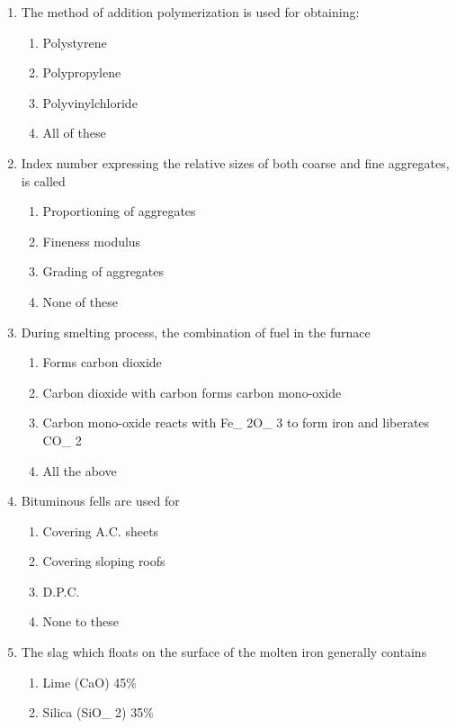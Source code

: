 \documentclass[11pt,a4paper]{article}
\begin{document}
\begin{enumerate}
\item{The method of addition polymerization is used for obtaining:}
\begin{enumerate}[label=\Alph*.]
\item{Polystyrene}
\item{Polypropylene}
\item{Polyvinylchloride}
\item{All of these}
\end{enumerate}
\item{Index number expressing the relative sizes of both coarse and fine aggregates, is called}
\begin{enumerate}[label=\Alph*.]
\item{Proportioning of aggregates}
\item{Fineness modulus}
\item{Grading of aggregates}
\item{None of these}
\end{enumerate}
\item{During smelting process, the combination of fuel in the furnace}
\begin{enumerate}[label=\Alph*.]
\item{Forms carbon dioxide}
\item{Carbon dioxide with carbon forms carbon mono-oxide}
\item{Carbon mono-oxide reacts with Fe\_ 2O\_ 3 to form iron and liberates CO\_ 2}
\item{All the above}
\end{enumerate}
\item{Bituminous fells are used for}
\begin{enumerate}[label=\Alph*.]
\item{Covering A.C. sheets}
\item{Covering sloping roofs}
\item{D.P.C.}
\item{None to these}
\end{enumerate}
\item{The slag which floats on the surface of the molten iron generally contains}
\begin{enumerate}[label=\Alph*.]
\item{Lime (CaO) 45\%}
\item{Silica (SiO\_ 2) 35\%}

\end{enumerate}
\end{enumerate}
\end{document}
